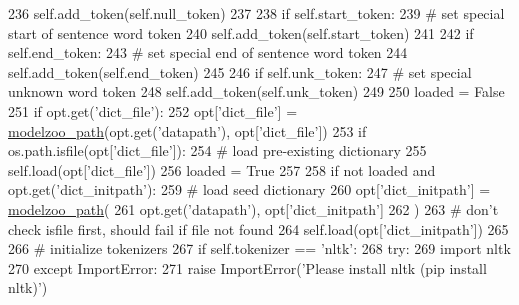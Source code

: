 \begin{DoxyCode}
236                 self.add\_token(self.null\_token)
237 
238             \textcolor{keywordflow}{if} self.start\_token:
239                 \textcolor{comment}{# set special start of sentence word token}
240                 self.add\_token(self.start\_token)
241 
242             \textcolor{keywordflow}{if} self.end\_token:
243                 \textcolor{comment}{# set special end of sentence word token}
244                 self.add\_token(self.end\_token)
245 
246             \textcolor{keywordflow}{if} self.unk\_token:
247                 \textcolor{comment}{# set special unknown word token}
248                 self.add\_token(self.unk\_token)
249 
250             loaded = \textcolor{keyword}{False}
251             \textcolor{keywordflow}{if} opt.get(\textcolor{stringliteral}{'dict\_file'}):
252                 opt[\textcolor{stringliteral}{'dict\_file'}] = \hyperlink{namespaceparlai_1_1agents_1_1legacy__agents_1_1seq2seq_1_1utils__v0_a5fbd3301b67f00d6d146fb01c7cd7626}{modelzoo\_path}(opt.get(\textcolor{stringliteral}{'datapath'}), opt[\textcolor{stringliteral}{'dict\_file'}])
253                 \textcolor{keywordflow}{if} os.path.isfile(opt[\textcolor{stringliteral}{'dict\_file'}]):
254                     \textcolor{comment}{# load pre-existing dictionary}
255                     self.load(opt[\textcolor{stringliteral}{'dict\_file'}])
256                     loaded = \textcolor{keyword}{True}
257 
258             \textcolor{keywordflow}{if} \textcolor{keywordflow}{not} loaded \textcolor{keywordflow}{and} opt.get(\textcolor{stringliteral}{'dict\_initpath'}):
259                 \textcolor{comment}{# load seed dictionary}
260                 opt[\textcolor{stringliteral}{'dict\_initpath'}] = \hyperlink{namespaceparlai_1_1agents_1_1legacy__agents_1_1seq2seq_1_1utils__v0_a5fbd3301b67f00d6d146fb01c7cd7626}{modelzoo\_path}(
261                     opt.get(\textcolor{stringliteral}{'datapath'}), opt[\textcolor{stringliteral}{'dict\_initpath'}]
262                 )
263                 \textcolor{comment}{# don't check isfile first, should fail if file not found}
264                 self.load(opt[\textcolor{stringliteral}{'dict\_initpath'}])
265 
266         \textcolor{comment}{# initialize tokenizers}
267         \textcolor{keywordflow}{if} self.tokenizer == \textcolor{stringliteral}{'nltk'}:
268             \textcolor{keywordflow}{try}:
269                 \textcolor{keyword}{import} nltk
270             \textcolor{keywordflow}{except} ImportError:
271                 \textcolor{keywordflow}{raise} ImportError(\textcolor{stringliteral}{'Please install nltk (pip install nltk)'})

\end{DoxyCode}
